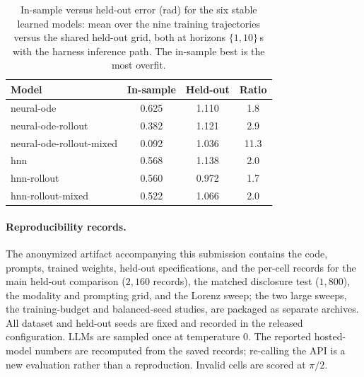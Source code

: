\documentclass{article}
\begin{document}
\begin{table}[tbp]
\centering\small
\caption{In-sample versus held-out error (rad) for the six stable learned models: mean over
the nine training trajectories versus the shared held-out grid, both at horizons
$\{1,10\}$\,s with the harness inference path. The in-sample best is the most overfit.}
\label{tab:insample}
\begin{tabular}{lccc}
\toprule
Model & In-sample & Held-out & Ratio \\
\midrule
neural-ode & 0.625 & 1.110 & 1.8 \\
neural-ode-rollout & 0.382 & 1.121 & 2.9 \\
neural-ode-rollout-mixed & 0.092 & 1.036 & 11.3 \\
hnn & 0.568 & 1.138 & 2.0 \\
hnn-rollout & 0.560 & 0.972 & 1.7 \\
hnn-rollout-mixed & 0.522 & 1.066 & 2.0 \\
\bottomrule
\end{tabular}
\end{table}

\paragraph{Reproducibility records.} The anonymized artifact accompanying this submission
contains the code, prompts, trained weights, held-out specifications, and the per-cell
records for the main held-out comparison ($2{,}160$ records), the matched disclosure test
($1{,}800$), the modality and prompting grid, and the Lorenz sweep; the two large sweeps, the
training-budget and balanced-seed studies, are packaged as separate archives. All dataset and
held-out seeds are fixed and recorded in the released configuration. LLMs are sampled once at
temperature 0. The reported hosted-model numbers are recomputed from the saved records; re-calling
the API is a new evaluation rather than a reproduction. Invalid cells are scored at $\pi/2$.
\end{document}
